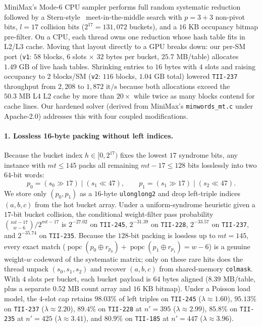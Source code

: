 \documentclass[11pt,a4paper]{article}
\begin{document}
MiniMax's Mode-6 CPU sampler performs full random systematic reduction followed by a Stern-style~\cite{Stern89,Dumer91} meet-in-the-middle search with $p=3+3$ non-pivot bits, $l=17$ collision bits ($2^{17} = 131{,}072$ buckets), and a $16\text{ KB}$ occupancy bitmap pre-filter. On a CPU, each thread owns one reduction whose hash table fits in L2/L3 cache. Moving that layout directly to a GPU breaks down: our per-SM port (\texttt{v1}: $58$ blocks, $6$ slots $\times$ $32$ bytes per bucket, $25.7\text{ MB}$/table) allocates $1.49\text{ GB}$ of live hash tables. Shrinking entries to $16$ bytes with $4$ slots and raising occupancy to $2$ blocks/SM (\texttt{v2}: $116$ blocks, $1.04\text{ GB}$ total) lowered \texttt{TII-237} throughput from $2{,}208$ to $1{,}872\text{ it/s}$ because both allocations exceed the $50.3\text{ MB}$ L4 L2 cache by more than $20\times$ while twice as many blocks contend for cache lines. Our hardened solver  (derived from MiniMax's \texttt{minwords\_mt.c} under Apache-2.0) addresses this with four coupled modifications.

\paragraph{1. Lossless 16-byte packing without left indices.}
Because the bucket index $h \in [0, 2^{17})$ fixes the lowest $17$ syndrome bits, any instance with $mt \le 145$ packs all remaining $mt - 17 \le 128$ bits losslessly into two $64$-bit words:
\[
  p_0 = (s_0 \gg 17) \mid (s_1 \ll 47), \qquad p_1 = (s_1 \gg 17) \mid (s_2 \ll 47).
\]
We store only $(p_0, p_1)$ as a $16$-byte \texttt{ulonglong2} and drop left-triple indices $(a, b, c)$ from the hot bucket array. Under a uniform-syndrome heuristic given a $17$-bit bucket collision, the conditional weight-filter pass probability $\binom{mt-17}{w-6}/2^{mt-17}$ is $2^{-27.02}$ on \texttt{TII-245}, $2^{-31.39}$ on \texttt{TII-228}, $2^{-33.57}$ on \texttt{TII-237}, and $2^{-35.74}$ on \texttt{TII-235}. Because the $128$-bit packing is lossless up to $mt=145$, every exact match ($\operatorname{popc}(p_0 \oplus r_{p_0}) + \operatorname{popc}(p_1 \oplus r_{p_1}) = w - 6$) is a genuine weight-$w$ codeword of the systematic matrix; only on these rare hits does the thread unpack $(s_0, s_1, s_2)$ and recover $(a, b, c)$ from shared-memory \texttt{colmask}. With $4$ slots per bucket, each bucket payload is $64$ bytes aligned ($8.39\text{ MB}$/table, plus a separate $0.52\text{ MB}$ count array and $16\text{ KB}$ bitmap). Under a Poisson load model, the $4$-slot cap retains $98.03\%$ of left triples on \texttt{TII-245} ($\lambda \approx 1.60$), $95.13\%$ on \texttt{TII-237} ($\lambda \approx 2.20$), $89.4\%$ on \texttt{TII-228} at $n'=395$ ($\lambda \approx 2.99$), $85.8\%$ on \texttt{TII-235} at $n'=425$ ($\lambda \approx 3.41$), and $80.9\%$ on \texttt{TII-185} at $n'=447$ ($\lambda \approx 3.96$).
\end{document}
